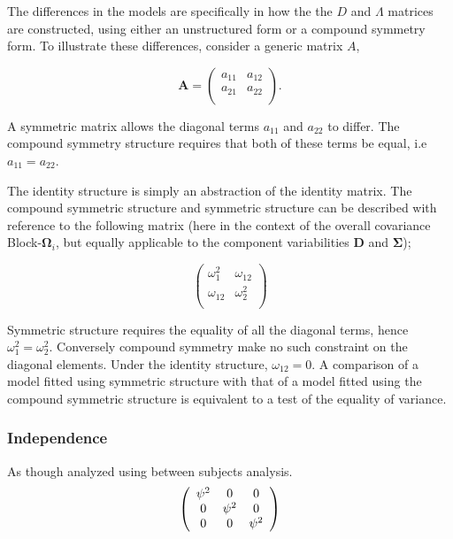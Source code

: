 \documentclass[12pt, a4paper]{report}
\theoremstyle{plain}
\theoremstyle{definition}
\theoremstyle{remark}
\begin{document}
		The differences in the models are specifically in how the the $D$ and $\Lambda$ matrices are constructed, using either an unstructured form or a compound symmetry form. To illustrate these differences, consider a generic matrix $A$,
		
		\[
		\boldsymbol{A} = \left( \begin{array}{cc}
		a_{11} & a_{12}  \\
		a_{21} & a_{22}  \\
		\end{array}\right).
		\]
		
		A symmetric matrix allows the diagonal terms $a_{11}$ and $a_{22}$ to differ. The compound symmetry structure requires that both of these terms be equal, i.e $a_{11} = a_{22}$.
		
		
		The identity structure is simply an abstraction of the identity matrix. The compound symmetric structure and symmetric structure can be described with reference to the following matrix (here in the context of the overall covariance Block-$\boldsymbol{\Omega}_i$, but equally applicable to the component variabilities $\boldsymbol{D}$ and $\boldsymbol{\Sigma}$);
		
		\[\left( \begin{array}{cc}
		\omega^2_1  & \omega_{12} \\
		\omega_{12} & \omega^2_2 \\
		\end{array}\right) \]
		
		Symmetric structure requires the equality of all the diagonal terms, hence $\omega^2_1 = \omega^2_2$. Conversely compound symmetry make no such constraint on the diagonal elements. Under the identity structure, $\omega_{12} = 0$.
		A comparison of a model fitted using symmetric structure with that of a model fitted using the compound symmetric structure is equivalent to a test of the equality of variance.
		
		
		
		
		
		\subsubsection{Independence}
		
		As though analyzed using between subjects analysis.
		\[
		\left(
		\begin{array}{c c c}
		\psi^2 & 0 & 0   \\
		0 & \psi^2 & 0   \\
		0 & 0 & \psi^2   \\
		\end{array}%
		\right)
		\]
		
\end{document}
